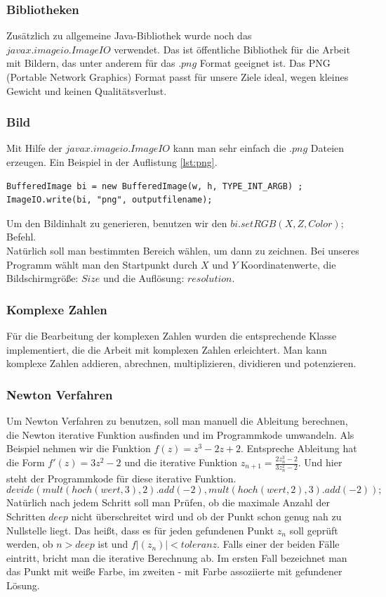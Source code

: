 \documentclass[a4paper,12pt]{llncs}
\numberwithin{equation}{section}
\begin{document}
\subsubsection{Bibliotheken}
Zusätzlich zu allgemeine Java-Bibliothek wurde noch das\\ $javax$.$imageio$.$ImageIO$ verwendet.
Das ist öffentliche Bibliothek für die Arbeit mit Bildern, das unter anderem für das .$png$ Format geeignet ist.
Das PNG (Portable Network Graphics) Format passt für unsere Ziele ideal, wegen kleines Gewicht und keinen Qualitätsverlust.
\subsubsection{Bild}
Mit Hilfe der $javax$.$imageio$.$ImageIO$ kann man sehr einfach die .$png$ Dateien erzeugen. Ein Beispiel in der Auflistung \ref{lst:png}.
\begin{lstlisting}[caption=Ein Beispiel für PNG Generierung, label=lst:png]
BufferedImage bi = new BufferedImage(w, h, TYPE_INT_ARGB) ;
ImageIO.write(bi, "png", outputfilename);
\end{lstlisting}
Um den Bildinhalt zu generieren, benutzen wir den $bi.setRGB(X, Z, Color);$ Befehl.\\
Natürlich soll man bestimmten Bereich wählen, um dann zu zeichnen. 
Bei unseres Programm wählt man den Startpunkt durch $X$ und $Y$ Koordinatenwerte, die Bildschirmgröße: $Size$ und die Auflösung: $resolution$. 
\subsubsection{Komplexe Zahlen}
Für die Bearbeitung der komplexen Zahlen wurden die entsprechende Klasse implementiert, die die Arbeit mit komplexen Zahlen erleichtert. 
Man kann komplexe Zahlen addieren, abrechnen, multiplizieren, dividieren und potenzieren.
\subsubsection{Newton Verfahren}
Um Newton Verfahren zu benutzen, soll man manuell die Ableitung berechnen, die Newton iterative Funktion ausfinden und im Programmkode umwandeln.
Als Beispiel nehmen wir die Funktion $f(z) = z^3 - 2z + 2$.
Entspreche Ableitung hat die Form $f'(z) = 3z^2 - 2$ und die iterative Funktion $z_{n+1} = \frac{2z_n^3 - 2}{3z_n^2 - 2}$.
Und hier steht der Programmkode für diese iterative Funktion.
\[
	devide(mult(hoch(wert,3),2).add(-2), mult(hoch(wert,2),3).add(-2));
\]
Natürlich nach jedem Schritt soll man Prüfen, ob die maximale Anzahl der Schritten $deep$ nicht überschreitet wird und ob der Punkt schon genug nah zu Nullstelle liegt. 
Das heißt, dass es für jeden gefundenen Punkt $z_n$ soll geprüft werden, ob $n > deep$ ist und $f|(z_n)| < toleranz$.
Falls einer der beiden Fälle eintritt, bricht man die iterative Berechnung ab.
Im ersten Fall bezeichnet man das Punkt mit weiße Farbe, im zweiten - mit Farbe assoziierte mit gefundener Lösung. 
\end{document}
